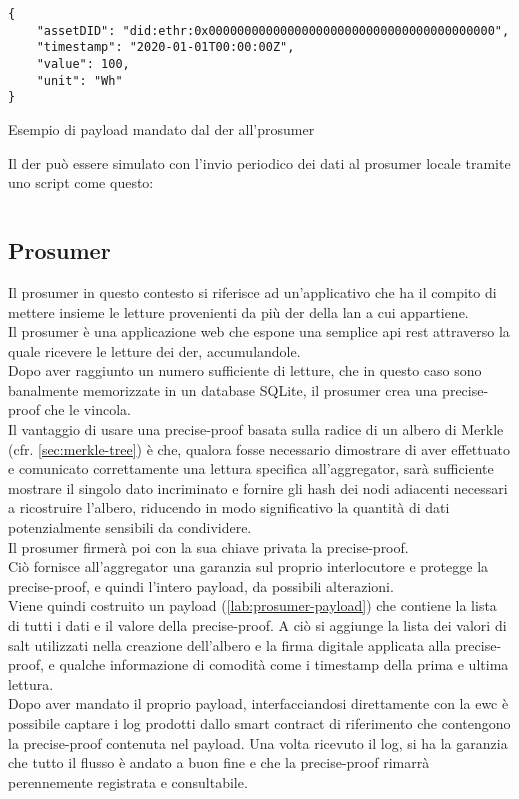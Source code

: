 \begin{listing}
    \begin{verbatim}
{
    "assetDID": "did:ethr:0x0000000000000000000000000000000000000000",
    "timestamp": "2020-01-01T00:00:00Z",
    "value": 100,
    "unit": "Wh"
}
\end{verbatim}
    \caption{Esempio di payload mandato dal \gls{der} all'\gls{prosumer}}\label{lab:der-payload}
\end{listing}

Il \gls{der} può essere simulato con l'invio periodico dei dati al \gls{prosumer} locale tramite uno script come questo:
\inputminted[linenos]{bash}{../der/iot_source.sh}

\subsection{Prosumer}
\label{sec:prosumer}

Il \gls{prosumer} in questo contesto si riferisce ad un'applicativo che ha il compito
di mettere insieme le letture provenienti da più \gls{der} della \gls{lan} a cui appartiene. \\
Il \gls{prosumer} è una applicazione web che espone una semplice \gls{api} \gls{rest} attraverso la quale ricevere le letture dei \gls{der}, accumulandole. \\
Dopo aver raggiunto un numero sufficiente di letture, che in questo caso sono banalmente memorizzate in un database
SQLite\cite{sftw:sqlite}, il \gls{prosumer} crea una precise-proof che le vincola. \\
Il vantaggio di usare una precise-proof basata sulla radice di un albero di Merkle (cfr. \autoref{sec:merkle-tree}) è che,
qualora fosse necessario dimostrare di aver effettuato e comunicato correttamente una lettura specifica all'\gls{aggregator},
sarà sufficiente mostrare il singolo dato incriminato e fornire gli hash dei nodi adiacenti necessari a ricostruire l'albero,
riducendo in modo significativo la quantità di dati potenzialmente sensibili da condividere. \\
Il \gls{prosumer} firmerà poi con la sua chiave privata la precise-proof. \\
Ciò fornisce all'\gls{aggregator} una garanzia sul proprio interlocutore e protegge la precise-proof, e quindi l'intero payload,
da possibili alterazioni. \\
Viene quindi costruito un payload (\autoref{lab:prosumer-payload}) che contiene la lista di tutti i dati e il valore della precise-proof.
A ciò si aggiunge la lista dei valori di salt \cite{wiki:salt} utilizzati nella creazione dell'albero e la firma digitale applicata alla precise-proof, e qualche informazione di comodità
come i timestamp della prima e ultima lettura. \\
Dopo aver mandato il proprio payload, interfacciandosi direttamente con la \gls{ewc} è possibile captare i log prodotti dallo smart contract di riferimento
che contengono la precise-proof contenuta nel payload.
Una volta ricevuto il log, si ha la garanzia che tutto il flusso è andato a buon fine e che la precise-proof rimarrà perennemente registrata e consultabile.

